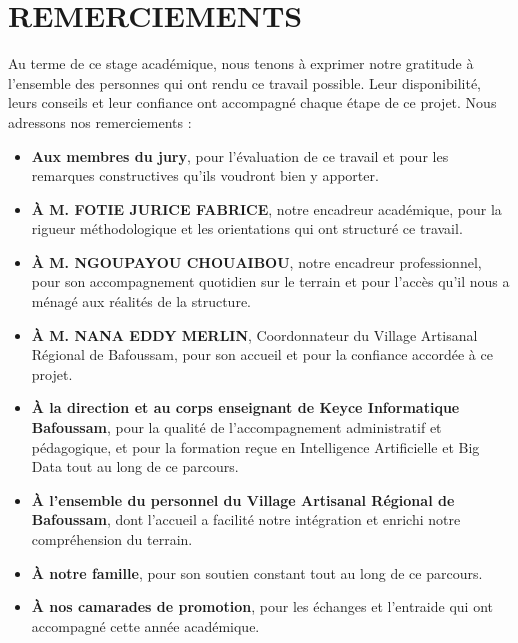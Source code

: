 \chapter*{REMERCIEMENTS}

Au terme de ce stage académique, nous tenons à exprimer notre gratitude à l'ensemble des personnes qui ont rendu ce travail possible. Leur disponibilité, leurs conseils et leur confiance ont accompagné chaque étape de ce projet. Nous adressons nos remerciements :

\begin{itemize}[leftmargin=1.2em,itemsep=0.5em]
\item \textbf{Aux membres du jury}, pour l'évaluation de ce travail et pour les remarques constructives qu'ils voudront bien y apporter.

\item \textbf{À M. FOTIE JURICE FABRICE}, notre encadreur académique, pour la rigueur méthodologique et les orientations qui ont structuré ce travail.

\item \textbf{À M. NGOUPAYOU CHOUAIBOU}, notre encadreur professionnel, pour son accompagnement quotidien sur le terrain et pour l'accès qu'il nous a ménagé aux réalités de la structure.

\item \textbf{À M. NANA EDDY MERLIN}, Coordonnateur du Village Artisanal Régional de Bafoussam, pour son accueil et pour la confiance accordée à ce projet.

\item \textbf{À la direction et au corps enseignant de Keyce Informatique Bafoussam}, pour la qualité de l'accompagnement administratif et pédagogique, et pour la formation reçue en Intelligence Artificielle et Big Data tout au long de ce parcours.

\item \textbf{À l'ensemble du personnel du Village Artisanal Régional de Bafoussam}, dont l'accueil a facilité notre intégration et enrichi notre compréhension du terrain.

\item \textbf{À notre famille}, pour son soutien constant tout au long de ce parcours.

\item \textbf{À nos camarades de promotion}, pour les échanges et l'entraide qui ont accompagné cette année académique.
\end{itemize}
\clearpage

